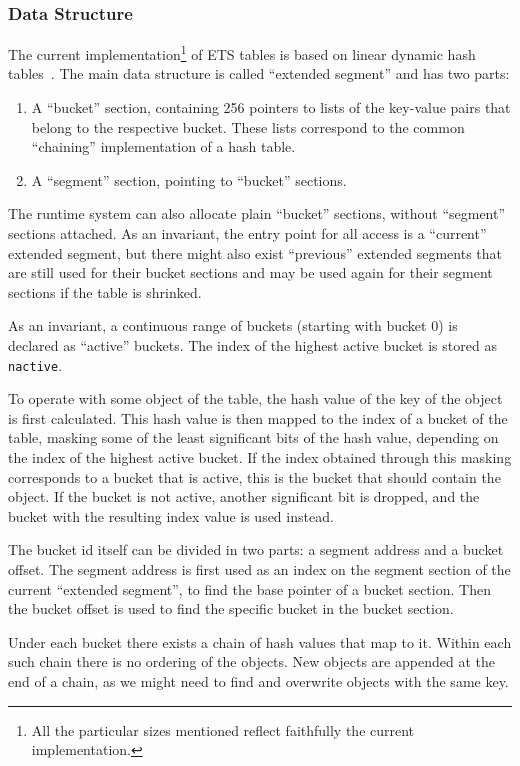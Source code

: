 \documentclass[aps,pre,preprint,nofootinbib]{revtex4}
\begin{document}
\subsubsection{Data Structure}

The current implementation\footnote{All the particular sizes mentioned reflect faithfully the current implementation.} of ETS tables is based on linear dynamic hash tables~\cite{Larson}.
The main data structure is called ``extended segment'' and has two parts:
\begin{enumerate}
  \item A ``bucket'' section, containing 256 pointers to lists of the key-value pairs that belong to the respective bucket.
    These lists correspond to the common ``chaining'' implementation of a hash table.
  \item A ``segment'' section, pointing to ``bucket'' sections.
\end{enumerate}
The runtime system can also allocate plain ``bucket'' sections, without ``segment'' sections attached.
As an invariant, the entry point for all access is a ``current'' extended segment, but there might also exist ``previous'' extended segments that are still used for their bucket sections and may be used again for their segment sections if the table is shrinked.

As an invariant, a continuous range of buckets (starting with bucket 0) is declared as ``active'' buckets.
The index of the highest active bucket is stored as \verb|nactive|.

To operate with some object of the table, the hash value of the key of the object is first calculated.
This hash value is then mapped to the index of a bucket of the table, masking some of the least significant bits of the hash value, depending on the index of the highest active bucket.
If the index obtained through this masking corresponds to a bucket that is active, this is the bucket that should contain the object.
If the bucket is not active, another significant bit is dropped, and the bucket with the resulting index value is used instead.

The bucket id itself can be divided in two parts: a segment address and a bucket offset.
The segment address is first used as an index on the segment section of the current ``extended segment'', to find the base pointer of a bucket section.
Then the bucket offset is used to find the specific bucket in the bucket section.

Under each bucket there exists a chain of hash values that map to it.
Within each such chain there is no ordering of the objects.
New objects are appended at the end of a chain, as we might need to find and overwrite objects with the same key.
\end{document}
